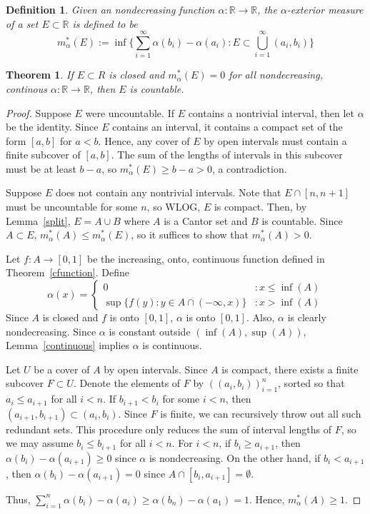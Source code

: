 \documentclass{article}
\newtheorem{theorem}{Theorem}
\newtheorem{definition}{Definition}
\newcommand{\m}{m^*_\alpha}
\begin{document}
\begin{definition}
Given an nondecreasing function $\alpha:\mathbb{R} \rightarrow \mathbb{R}$, the \emph{$\alpha$-exterior measure} of a set $E \subset \mathbb{R}$ is defined to be
$$\m(E) := \inf\{\sum_{i=1}^\infty {\alpha(b_i) - \alpha(a_i)}: E \subset \bigcup_{i=1}^\infty {(a_i,b_i)} \}$$
\end{definition}

\begin{theorem}
If $E \subset R$ is closed and $\m(E) = 0$ for all nondecreasing, continous $\alpha:\mathbb{R} \rightarrow \mathbb{R}$, then $E$ is countable.
\end{theorem}
\begin{proof}
Suppose $E$ were uncountable. If $E$ contains a nontrivial interval, then let $\alpha$ be the identity. Since $E$ contains an interval, it contains a compact set of the form $[a,b]$ for $a<b$. Hence, any cover of $E$ by open intervals must contain a finite subcover of $[a,b]$. The sum of the lengths of intervals in this subcover must be at least $b-a$, so $\m(E) \geq b - a > 0$, a contradiction.

Suppose $E$ does not contain any nontrivial intervals. Note that $E \cap [n,n+1]$ must be uncountable for some $n$, so WLOG, $E$ is compact. Then, by Lemma~\ref{split}, $E = A \cup B$ where $A$ is a Cantor set and $B$ is countable. Since $A \subset E$, $\m(A) \leq \m(E)$, so it suffices to show that $\m(A) > 0$.

Let $f:A \rightarrow [0,1]$ be the increasing, onto, continuous function defined in Theorem~\ref{cfunction}. Define
 \begin{displaymath}
   \alpha(x) = \left\{
     \begin{array}{lr}
       0 & : x \leq \inf(A)\\
       \sup\{f(y): y \in A \cap (-\infty, x)\} & : x > \inf(A)
     \end{array}
   \right.
\end{displaymath} 
Since $A$ is closed and $f$ is onto $[0,1]$, $\alpha$ is onto $[0,1]$. Also, $\alpha$ is clearly nondecreasing. Since $\alpha$ is constant outside $(\inf(A), \sup(A))$, Lemma~\ref{continuous} implies $\alpha$ is continuous.

Let $U$ be a cover of $A$ by open intervals. Since $A$ is compact, there exists a finite subcover $F \subset U$. Denote the elements of $F$ by  $((a_i, b_i))_{i=1}^n$, sorted so that $a_i \leq a_{i+1}$ for all $i<n$. If $b_{i+1} < b_i$ for some $i < n$, then $(a_{i+1}, b_{i+1}) \subset (a_i, b_i)$. Since $F$ is finite, we can recursively throw out all such redundant sets. This procedure only reduces the sum of interval lengths of $F$, so we may assume $b_i \leq b_{i+1}$ for all $i<n$. For $i < n$, if $b_i \geq a_{i+1}$, then $\alpha(b_i) - \alpha(a_{i+1}) \geq 0$ since $\alpha$ is nondecreasing. On the other hand, if $b_i < a_{i+1}$, then $\alpha(b_i) - \alpha(a_{i+1}) = 0$ since $A \cap [b_i, a_{i+1}] = \emptyset$. 

Thus, $\sum_{i=1}^n {\alpha(b_i) - \alpha(a_i)} \geq \alpha(b_n) - \alpha(a_1) = 1$. Hence, $\m(A) \geq 1$.
\end{proof}
\end{document}
